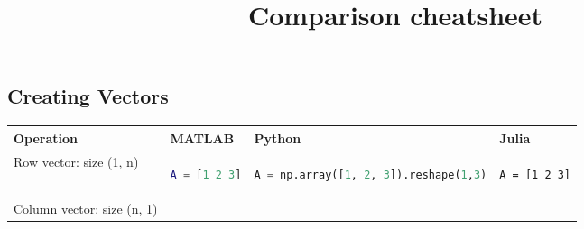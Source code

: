 \documentclass[10pt, landscape]{article}
\title{Comparison cheatsheet}
\date{}
\begin{document}
\begin{multicols}{2}

\section{Creating Vectors}\label{creating-vectors}

\begin{tabular}[]{@{}llll@{}}
\toprule
\begin{minipage}[b]{0.21\columnwidth}\raggedright\strut
Operation\strut
\end{minipage} & \begin{minipage}[b]{0.19\columnwidth}\raggedright\strut
MATLAB\strut
\end{minipage} & \begin{minipage}[b]{0.29\columnwidth}\raggedright\strut
Python\strut
\end{minipage} & \begin{minipage}[b]{0.19\columnwidth}\raggedright\strut
Julia\strut
\end{minipage}\tabularnewline
\midrule
\begin{minipage}[t]{0.21\columnwidth}\raggedright\strut
Row vector: size (1, n)\strut
\end{minipage} & \begin{minipage}[t]{0.19\columnwidth}\raggedright\strut
\begin{lstlisting}[language=Matlab]
A = [1 2 3]
\end{lstlisting}
\strut
\end{minipage} & \begin{minipage}[t]{0.29\columnwidth}\raggedright\strut
\begin{lstlisting}[language=Python]
A = np.array([1, 2, 3]).reshape(1,3)
\end{lstlisting}
\strut
\end{minipage} & \begin{minipage}[t]{0.19\columnwidth}\raggedright\strut
\begin{lstlisting}
A = [1 2 3]
\end{lstlisting}
\strut
\end{minipage}\tabularnewline
\begin{minipage}[t]{0.21\columnwidth}\raggedright\strut
Column vector: size (n, 1)\strut
\end{minipage} & \begin{minipage}[t]{0.19\columnwidth}\raggedright\strut

\end{minipage}
\end{tabular}
\end{multicols}
\end{document}
